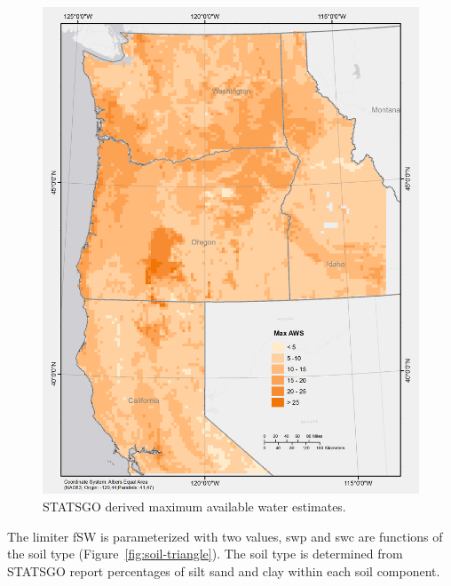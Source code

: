 \documentclass[preprint,12pt]{elsarticle}
\begin{document}
\begin{figure}
  \centering
\includegraphics[width=1\linewidth]{maxaws}
  \caption{\ac{STATSGO} derived maximum available water estimates. }
  \label{fig:aws}
\end{figure}

The limiter \ac{fSW} is parameterized with two values, \ac{swp} and
\ac{swc} are functions of the soil type (Figure~\ref{fig:soil-triangle}).  The
soil type is determined from \ac{STATSGO} report  percentages of
silt sand and clay within each soil component.

\end{document}
